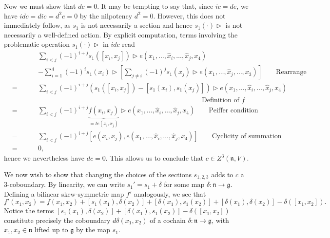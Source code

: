 \documentclass[onecolumn]{article}
\theoremstyle{theorem}
\theoremstyle{remark}
\theoremstyle{example}
\theoremstyle{definition}
\numberwithin{equation}{section}
\begin{document}
Now we must show that $dc=0$. It may be tempting to say that, since $ic=de$, we have $idc = dic = d^2e=0$ by the nilpotency $d^2=0$. However, this does not immediately follow, as $s_1$ is not necessarily a section and hence $s_1(\cdot)\rhd$ is not necessarily a well-defined action. By explicit computation, terms involving the problematic operation $s_1(\cdot) \rhd$ in $idc$ read
\begin{eqnarray}
    &\quad& \sum_{i<j}(-1)^{i+j}s_1([x_i,x_j])\rhd e(x_1,\dots,\hat{x}_i,\dots,\hat{x}_j,x_4) \nonumber \\
    &\qquad\quad & - \sum_{i=1}^4 (-1)^is_1(x_i)\rhd \left[\sum_{j\neq i} (-1)^j s_1(x_j)\rhd e(x_1,\dots,\hat{x}_j,\dots,x_3)\right] \qquad \text{Rearrange}\nonumber \\
     &=&\sum_{i<j}(-1)^{i+j}\left(s_1([x_i,x_j]) - [s_1(x_i),s_1(x_j)]\right)\rhd e(x_1,\dots,\hat{x}_i,\dots,\hat{x}_j,x_4)\nonumber\\
     &\qquad &\qquad\qquad\qquad\qquad\qquad\qquad\qquad\qquad\qquad\qquad\qquad\qquad\text{Definition of $f$}\nonumber \\
     &=&\sum_{i<j}(-1)^{i+j}\underbrace{f(x_i,x_j)}_{=te(x_i,x_j)}\rhd e(x_1,\dots,\hat{x}_i,\dots,\hat{x}_j,x_4) \qquad \text{Peiffer condition}\nonumber \\
     &=& \sum_{i<j}(-1)^{i+j}[e(x_i,x_j),e(x_1,\dots,\hat{x}_i,\dots,\hat{x}_j,x_4)] \qquad \text{Cyclicity of summation}\nonumber \\
     &=&0, \nonumber
\end{eqnarray}
hence we nevertheless have $dc=0$. This allows us to conclude that $c\in Z^3(\mathfrak{n},V)$.

We now wish to show that changing the choices of the sections $s_{1,2,3}$ adds to $c$ a 3-coboundary. By linearity, we can write $s_1' = s_1 + \delta$ for some map $\delta:\mathfrak{n}\rightarrow \mathfrak{g}$. Defining a bilinear skew-symmetric map $f'$ analogously, we see that
\begin{equation}
    f'(x_1,x_2) = f(x_1,x_2) + [s_1(x_1),\delta(x_2)] + [\delta(x_1),s_1(x_2)] + [\delta(x_1),\delta(x_2)] - \delta([x_1,x_2]).\nonumber
\end{equation}
{Notice} the terms $[s_1(x_1),\delta(x_2)] + [\delta(x_1),s_1(x_2)] - \delta([x_1,x_2])$ constitute precisely the coboundary $d\delta(x_1,x_2)$ of a cochain $\delta:\mathfrak{n}\rightarrow\mathfrak{g}$, with $x_1,x_2\in\mathfrak{n}$ lifted up to $\mathfrak{g}$ by the map $s_1$.
\end{document}
